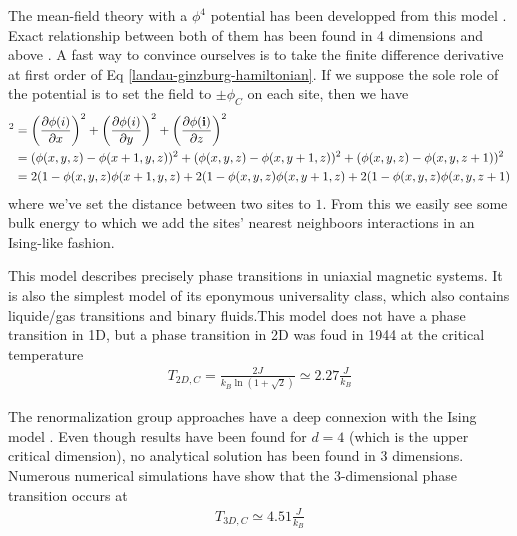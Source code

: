 {{\color{red} 
The mean-field theory with a $\phi^4$ potential has been developped from this model \cite{bellac_equilibrium_2004}. Exact relationship between both of them has been found in 4 dimensions and above \cite{aizenman_proof_1981}. A fast way to convince ourselves is to take the finite difference derivative at first order of Eq \eqref{landau-ginzburg-hamiltonian}. If we suppose the sole role of the potential is to set the field to $\pm \phi_C$ on each site, then we have
\begin{align}
    [{\boldsymbol \nabla} \phi(i)]^2 &= \left( \frac{\partial \phi(i)}{\partial x} \right)^2  + \left( \frac{\partial \phi(i)}{\partial y} \right)^2 + \left( \frac{\partial \phi({\bf i})}{\partial z} \right)^2\nn
    &= (\phi(x,y,z)-\phi(x+1,y,z))^2 + (\phi(x,y,z)-\phi(x,y+1,z))^2 + (\phi(x,y,z)-\phi(x,y,z+1))^2 \nn
    &= 2 (1-\phi(x,y,z)\phi(x+1,y,z) + 2 (1-\phi(x,y,z)\phi(x,y+1,z) +2 (1-\phi(x,y,z)\phi(x,y,z+1) 
    \label{discretisation-landau}
\end{align}
where we've set the distance between two sites to $1$.
From this we easily see some bulk energy to which we add the sites' nearest neighboors interactions in an Ising-like fashion.}

This model describes precisely phase transitions in uniaxial magnetic systems\cite{de_jongh_experiments_1974,wp_wold_ising_2000,ikeda_neutron_1973}. It is also the simplest model of its eponymous universality class, which also contains liquide/gas transitions and binary fluids.This model does not have a phase transition in 1D, but a phase transition in 2D was foud in 1944\cite{onsager_crystal_1944} at the critical temperature 
\begin{align}
     T_{2D,C} = \frac{2J}{k_B \ln(1 + \sqrt{2})} \simeq 2.27 \frac{J}{k_B}
\end{align}

The renormalization group approaches have a deep connexion with the Ising model \cite{frohlich_triviality_1981,goldenfeld_lectures_2018}. Even though results have been found for $d=4$ (which is the upper critical dimension), no analytical solution has been found in 3 dimensions. Numerous numerical simulations  \cite{talapov_magnetization_1996,preis_gpu_2009} have show that the 3-dimensional phase transition occurs at 
\begin{align}
    T_{3D,C} \simeq 4.51 \frac{J}{k_B}
\end{align}
}
